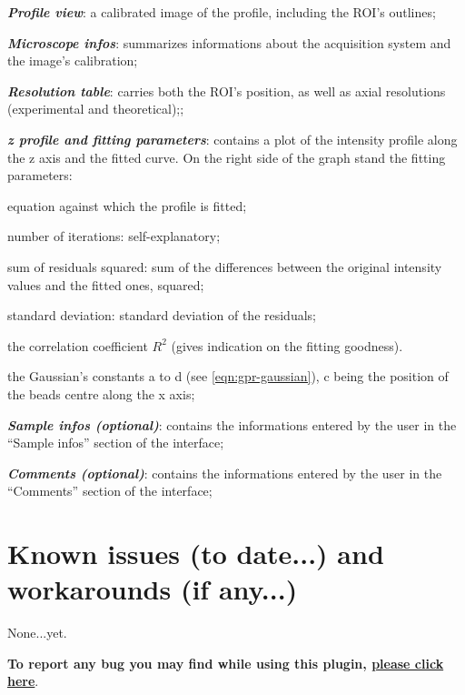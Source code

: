\documentclass[a4paper, 11pt]{report}%
\makeatletter
\newcommand{\mailbug}{\begin{center}\textbf{To report any bug you may find while using this plugin, \href{mailto:fabrice.cordelieres@gmail.com,cedric.matthews@ibdml.univ-mrs.fr ?subject=Bug\%20found\%20in\%20MetroloJ&body=\%0ABug\%20description:\%0A\%0AHow\%20did\%20it\%20happen:\%0A\%0ACopy/Paste\%20the\%20content\%20of\%20the\%20log\%20window\%0A\%0AVersion\%20of\%20ImageJ:\%0A\%0AVersion\%20of\%20Java:}{please click here}}.\end{center}}
\makeatother
\begin{document}
\begin{itemize*}
	\item \textbf{\textit{Profile view}}: a calibrated image of the profile, including the ROI's outlines;
	\item \textbf{\textit{Microscope infos}}: summarizes informations about the acquisition system and the image's calibration;
	\item \textbf{\textit{Resolution table}}: carries both the ROI's position, as well as axial resolutions (experimental and theoretical);;
	\item \textbf{\textit{z profile and fitting parameters}}: contains a plot of the intensity profile along the z axis and the fitted curve. On the right side of the graph stand the fitting parameters:
		\begin{itemize*}
			\item equation against which the profile is fitted;
			\item number of iterations: self-explanatory;
			\item sum of residuals squared: sum of the differences between the original intensity values and the fitted ones, squared;
			\item standard deviation: standard deviation of the residuals;
			\item the correlation coefficient $R^{2}$ (gives indication on the fitting goodness).
			\item the Gaussian's constants a to d (see \ref{eqn:gpr-gaussian}), c being the position of the beads centre along the x axis;	
		\end{itemize*}
	\item \textbf{\textit{Sample infos (optional)}}: contains the informations entered by the user in the ``Sample infos'' section of the interface;
	\item \textbf{\textit{Comments (optional)}}: contains the informations entered by the user in the ``Comments'' section of the interface;
\end{itemize*}


\section{Known issues (to date...) and workarounds (if any...)}
\label{sec:garr-ki}

None...yet.

\mailbug
\end{document}
